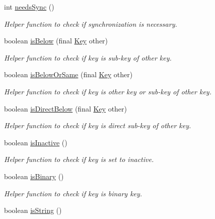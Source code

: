 \begin{DoxyCompactItemize}
int \mbox{\hyperlink{classorg_1_1libelektra_1_1Key_a6f5afab907a28b264af0981e9db58c64}{needs\+Sync}} ()
\begin{DoxyCompactList}\small\item\em Helper function to check if synchronization is necessary. \end{DoxyCompactList}\item 
boolean \mbox{\hyperlink{classorg_1_1libelektra_1_1Key_af9a7a7941c07c058f1d4bd6c55e20fe9}{is\+Below}} (final \mbox{\hyperlink{classorg_1_1libelektra_1_1Key}{Key}} other)
\begin{DoxyCompactList}\small\item\em Helper function to check if key is sub-\/key of other key. \end{DoxyCompactList}\item 
boolean \mbox{\hyperlink{classorg_1_1libelektra_1_1Key_ab3143b14824a384ec4b6f9005f6da554}{is\+Below\+Or\+Same}} (final \mbox{\hyperlink{classorg_1_1libelektra_1_1Key}{Key}} other)
\begin{DoxyCompactList}\small\item\em Helper function to check if key is other key or sub-\/key of other key. \end{DoxyCompactList}\item 
boolean \mbox{\hyperlink{classorg_1_1libelektra_1_1Key_a799b0577d5e1491702e45566c943bda4}{is\+Direct\+Below}} (final \mbox{\hyperlink{classorg_1_1libelektra_1_1Key}{Key}} other)
\begin{DoxyCompactList}\small\item\em Helper function to check if key is direct sub-\/key of other key. \end{DoxyCompactList}\item 
boolean \mbox{\hyperlink{classorg_1_1libelektra_1_1Key_a1707144b9d6c0c29531e3e372e1ffaee}{is\+Inactive}} ()
\begin{DoxyCompactList}\small\item\em Helper function to check if key is set to inactive. \end{DoxyCompactList}\item 
boolean \mbox{\hyperlink{classorg_1_1libelektra_1_1Key_a2323fd06287eac6343ed60756f3cc9c1}{is\+Binary}} ()
\begin{DoxyCompactList}\small\item\em Helper function to check if key is binary key. \end{DoxyCompactList}\item 
boolean \mbox{\hyperlink{classorg_1_1libelektra_1_1Key_acb0e1141fa920b798a66a2076cd61562}{is\+String}} ()

\end{DoxyCompactItemize}
